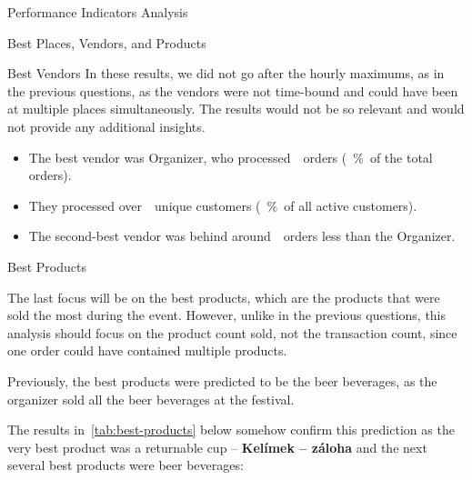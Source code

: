 \begin{section}{Performance Indicators Analysis}
\begin{subsection}{Best Places, Vendors, and Products}
\begin{subsubsection}{Best Vendors}
			In these results, we did not go after the hourly maximums, as in the previous questions, as the vendors were not time-bound and could have been at multiple places simultaneously.
			The results would not be so relevant and would not provide any additional insights.

			\begin{keytakeaways}
				\begin{itemize}
					\item The best vendor was Organizer, who processed~~orders (~\%~of the total orders).
					\item They processed over~~unique customers (~\%~of all active customers).
					\item The second-best vendor was behind around~~orders less than the Organizer.
				\end{itemize}
			\end{keytakeaways}
		\end{subsubsection}

		\begin{subsubsection}{Best Products}
			\label{subsubsec:analysis-best-products}

			The last focus will be on the best products, which are the products that were sold the most during the event.
			However, unlike in the previous questions, this analysis should focus on the product count sold, not the transaction count, since one order could have contained multiple products.


			Previously, the best products were predicted to be the beer beverages, as the organizer sold all the beer beverages at the festival.

			The results in~\autoref{tab:best-products} below somehow confirm this prediction as the very best product was a returnable cup – \textbf{Kelímek – záloha} and the next several best products were beer beverages:


\end{subsubsection}
\end{subsection}
\end{section}
